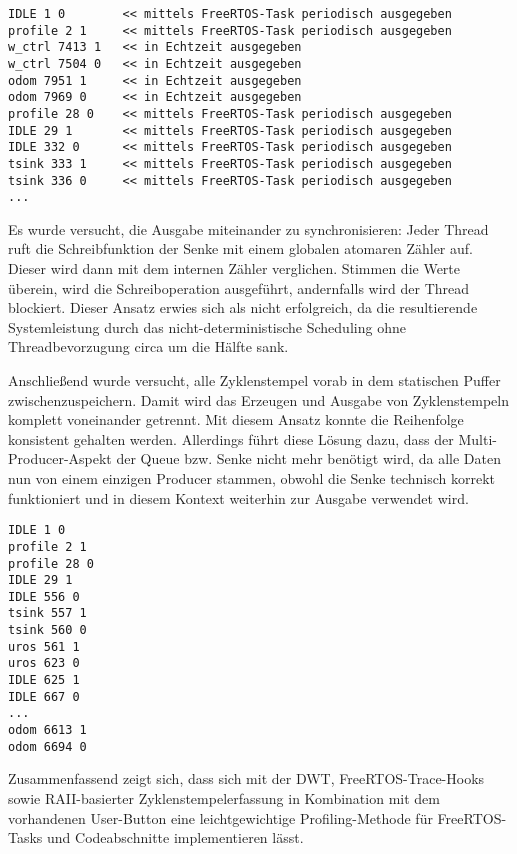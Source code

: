 \begin{code}
\begin{verbatim}
IDLE 1 0        << mittels FreeRTOS-Task periodisch ausgegeben
profile 2 1     << mittels FreeRTOS-Task periodisch ausgegeben
w_ctrl 7413 1   << in Echtzeit ausgegeben
w_ctrl 7504 0   << in Echtzeit ausgegeben
odom 7951 1     << in Echtzeit ausgegeben
odom 7969 0     << in Echtzeit ausgegeben
profile 28 0    << mittels FreeRTOS-Task periodisch ausgegeben
IDLE 29 1       << mittels FreeRTOS-Task periodisch ausgegeben
IDLE 332 0      << mittels FreeRTOS-Task periodisch ausgegeben
tsink 333 1     << mittels FreeRTOS-Task periodisch ausgegeben
tsink 336 0     << mittels FreeRTOS-Task periodisch ausgegeben
...
\end{verbatim}
\end{code}

Es wurde versucht, die Ausgabe miteinander zu synchronisieren: Jeder Thread ruft
die Schreibfunktion der Senke mit einem globalen atomaren Zähler auf. Dieser
wird dann mit dem internen Zähler verglichen. Stimmen die Werte überein, wird
die Schreiboperation ausgeführt, andernfalls wird der Thread blockiert. Dieser
Ansatz erwies sich als nicht erfolgreich, da die resultierende Systemleistung
durch das nicht-deterministische Scheduling ohne Threadbevorzugung circa um die
Hälfte sank.

Anschließend wurde versucht, alle Zyklenstempel vorab in dem statischen Puffer
zwischenzuspeichern. Damit wird das Erzeugen und Ausgabe von Zyklenstempeln
komplett voneinander getrennt. Mit diesem Ansatz konnte die Reihenfolge
konsistent gehalten werden. Allerdings führt diese Lösung dazu, dass der
Multi-Producer-Aspekt der Queue bzw. Senke nicht mehr benötigt wird, da alle
Daten nun von einem einzigen Producer stammen, obwohl die Senke technisch
korrekt funktioniert und in diesem Kontext weiterhin zur Ausgabe verwendet wird.

\begin{code}
\begin{verbatim}
IDLE 1 0
profile 2 1
profile 28 0
IDLE 29 1
IDLE 556 0
tsink 557 1
tsink 560 0
uros 561 1
uros 623 0
IDLE 625 1
IDLE 667 0
...
odom 6613 1
odom 6694 0
\end{verbatim}
\end{code}

Zusammenfassend zeigt sich, dass sich mit der DWT, FreeRTOS-Trace-Hooks sowie
RAII-basierter Zyklenstempelerfassung in Kombination mit dem vorhandenen
User-Button eine leichtgewichtige Profiling-Methode für FreeRTOS-Tasks und
Codeabschnitte implementieren lässt.
